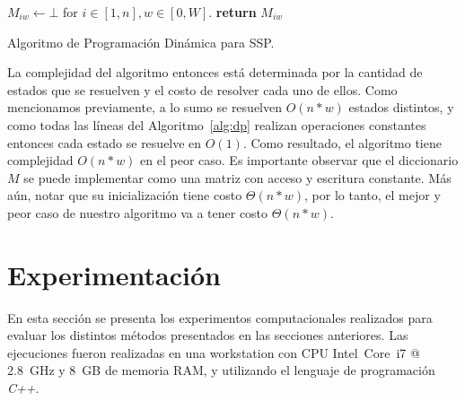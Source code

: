\documentclass[10pt,a4paper]{article}
\begin{document}
\begin{algorithm}
\begin{algorithmic}[1]
\State $M_{iw} \gets \bot$ for $i \in [1, n], w \in [0, W]$.
     \label{linea:memoizacion}
    \State \textbf{return} $M_{iw}$
\EndFunction
\end{algorithmic}
\caption{Algoritmo de Programación Dinámica para SSP.}
\label{alg:dp}
\end{algorithm}

La complejidad del algoritmo entonces está determinada por la cantidad de estados que se resuelven y el costo de resolver cada uno de ellos. Como mencionamos previamente, a lo sumo se resuelven $O(n * w)$ estados distintos, y como todas las líneas del Algoritmo~\ref{alg:dp} realizan operaciones constantes entonces cada estado se resuelve en $O(1)$. Como resultado, el algoritmo tiene complejidad $O(n*w)$ en el peor caso. Es importante observar que el diccionario $M$ se puede implementar como una matriz con acceso y escritura constante. Más aún, notar que su inicialización tiene costo $\Theta(n*w)$, por lo tanto, el mejor y peor caso de nuestro algoritmo va a tener costo $\Theta(n*w)$.

\section{Experimentación} \label{sec:experimentacion}
En esta sección se presenta los experimentos computacionales realizados para evaluar los distintos métodos presentados en las secciones anteriores. Las ejecuciones fueron realizadas en una workstation con CPU Intel~Core~i7 @ 2.8~GHz y 8~GB de memoria RAM, y utilizando el lenguaje de programación \emph{C++}.
\end{document}

